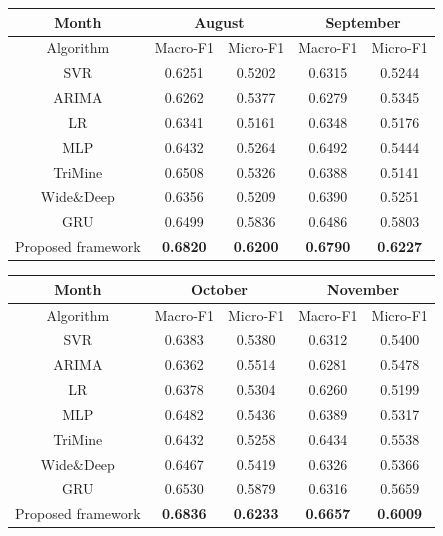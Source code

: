 \begin{table}
    \centering
    \footnotesize
    \begin{tabular}{c|c|c|c|c}
        \toprule
        Month & \multicolumn{2}{|c|}{August} & \multicolumn{2}{|c}{September}\\[0.1cm]
        \hline
        Algorithm & Macro-F1 & Micro-F1    & Macro-F1 & Micro-F1 \\[0.1cm]
        \hline
        SVR & 0.6251 & 0.5202 & 0.6315 & 0.5244\\[0.1cm]
        ARIMA & 0.6262 & 0.5377 & 0.6279 & 0.5345 \\[0.1cm]
        LR & 0.6341 & 0.5161 & 0.6348 & 0.5176\\[0.1cm]
        MLP & 0.6432 & 0.5264 & 0.6492 & 0.5444\\[0.1cm]
        TriMine & 0.6508 & 0.5326 & 0.6388 & 0.5141\\[0.1cm]
        Wide\&Deep & 0.6356 & 0.5209 & 0.6390 & 0.5251\\[0.1cm]
        GRU & 0.6499 & 0.5836 & 0.6486 & 0.5803\\[0.1cm]
        \toprule
        Proposed framework & \bf 0.6820 & \bf 0.6200 & \bf 0.6790 & \bf 0.6227\\
        \bottomrule
    \end{tabular}

    \vspace{0.1cm}

    \begin{tabular}{c|c|c|c|c}
        \toprule
        Month & \multicolumn{2}{|c|}{October} & \multicolumn{2}{|c}{November}\\[0.1cm]
        \hline
        Algorithm & Macro-F1 & Micro-F1    & Macro-F1 & Micro-F1 \\[0.1cm]
        \hline
        SVR & 0.6383 & 0.5380 & 0.6312 & 0.5400\\[0.1cm]
        ARIMA & 0.6362 & 0.5514 & 0.6281 & 0.5478\\[0.1cm]
        LR & 0.6378 & 0.5304 & 0.6260 & 0.5199\\[0.1cm]
        MLP & 0.6482 & 0.5436 & 0.6389 & 0.5317\\[0.1cm]
        TriMine & 0.6432 & 0.5258 & 0.6434 & 0.5538\\[0.1cm]
        Wide\&Deep & 0.6467 & 0.5419 & 0.6326 & 0.5366\\[0.1cm]
        GRU & 0.6530 & 0.5879 & 0.6316 & 0.5659\\[0.1cm]
        \toprule
        Proposed framework & \bf 0.6836 & \bf 0.6233 & \bf 0.6657 & \bf 0.6009\\
        \bottomrule
    \end{tabular}


\end{table}
